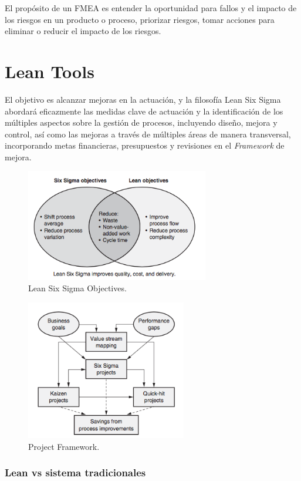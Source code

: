 \documentclass[oneside]{book}
\begin{document}
El propósito de un FMEA es entender la oportunidad para fallos y el impacto de los riesgos en un producto o proceso, priorizar riesgos, tomar acciones para eliminar o reducir el impacto de los riesgos.

\chapter{Lean Tools}
El objetivo es alcanzar mejoras en la actuación, y la filosofía Lean Six Sigma abordará eficazmente las medidas clave de actuación y la identificación de los múltiples aspectos sobre la gestión de procesos, incluyendo diseño, mejora y control, así como las mejoras a través de múltiples áreas de manera transversal, incorporando metas financieras, presupuestos y revisiones en el \textit{Framework} de mejora.

\begin{figure}[H]
	\centering
	\includegraphics[width=80mm]{imagenes/LeanSixSigmaObjectives.png}
	\caption{Lean Six Sigma Objectives.}
	\label{fig:LeanSixSigmaObjectives}
\end{figure}

\begin{figure}[H]
	\centering
	\includegraphics[width=70mm]{imagenes/ProjectFramework.png}
	\caption{Project Framework.}
	\label{fig:ProjectFramework}
\end{figure}

\subsection{Lean vs sistema tradicionales}
\end{document}
